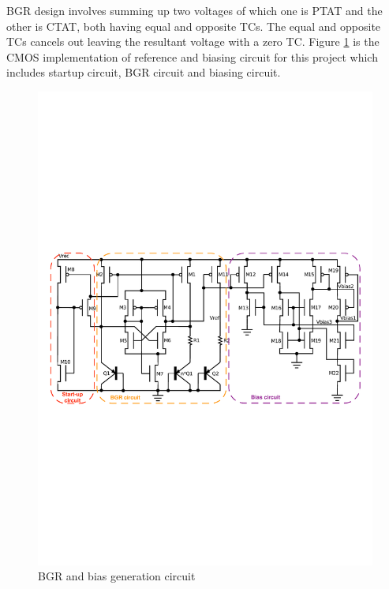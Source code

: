 \documentclass[12pt,a4paper,UKenglish]{article}
\begin{document}
BGR design involves summing up two voltages of which one is PTAT and the other is CTAT, both having equal and opposite TCs. The equal and opposite TCs cancels out leaving the resultant voltage with a zero TC. Figure  \ref{bgr_sch} is the CMOS implementation of reference and biasing circuit for this project which includes startup circuit, BGR circuit and biasing circuit. \\

\begin{figure}[htbp] %
   \centering
   \includegraphics[width=\textwidth]{img/sch_bgr_label.pdf} 
   \caption{BGR and bias generation circuit}
   \label{bgr_sch}
\end{figure}
\end{document}
